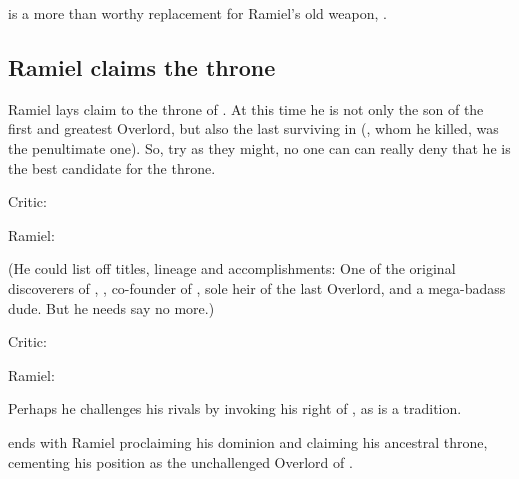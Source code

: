 \Scaleron{} is a more than worthy replacement for Ramiel's old weapon, \Ascaril. 









\subsection{Ramiel claims the throne}
Ramiel lays claim to the throne of \Mystraacht. 
At this time he is not only the son of the first and greatest Overlord, but also the last surviving \sathariah{} in \Mystraacht{} (\Shiaraid{}, whom he killed, was the penultimate one). 
So, try as they might, no one can can really deny that he is the best candidate for the throne. 

\begin{prose}
Critic: 

Ramiel: 

(He could list off titles, lineage and accomplishments: 
One of the original discoverers of \Semiza, \sathariah, co-founder of \Mystraacht, sole heir of the last Overlord, and a mega-badass dude. 
But he needs say no more.) 

Critic: 

Ramiel: 
\end{prose}

Perhaps he challenges his rivals by invoking his right of , as is a \Mystraacht{} tradition.

\emph{\RamielsAwakeningBook} ends with Ramiel proclaiming his dominion and claiming his ancestral throne, cementing his position as the unchallenged Overlord of \Mystraacht. 


